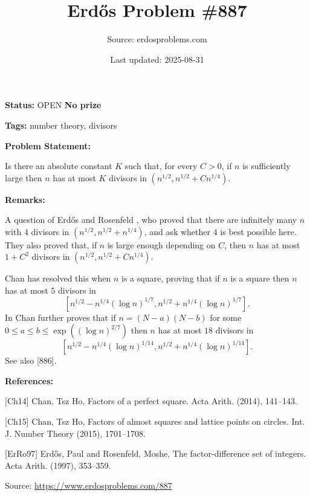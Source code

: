 \documentclass{article}
\title{Erd\H{o}s Problem \#887}
\date{Last updated: 2025-08-31}
\author{Source: erdosproblems.com}
\begin{document}
\maketitle

\noindent\textbf{Status:} OPEN \quad \textbf{No prize}

\noindent\textbf{Tags:} number theory, divisors

\medskip
\noindent\textbf{Problem Statement:}

Is there an absolute constant $K$ such that, for every $C>0$, if $n$ is sufficiently large then $n$ has at most $K$ divisors in $(n^{1/2},n^{1/2}+C n^{1/4})$.

\bigskip
\noindent\textbf{Remarks:}

A question of Erd\H{o}s and Rosenfeld \cite{ErRo97}, who proved that there are infinitely many $n$ with $4$ divisors in $(n^{1/2},n^{1/2}+n^{1/4})$, and ask whether $4$ is best possible here. They also proved that, if $n$ is large enough depending on $C$, then $n$ has at most $1+C^2$ divisors in $(n^{1/2},n^{1/2}+C n^{1/4})$. 

Chan \cite{Ch14} has resolved this when $n$ is a square, proving that if $n$ is a square then $n$ has at most $5$ divisors in\[[ n^{1/2}-n^{1/4}(\log n)^{1/7}, n^{1/2}+n^{1/4}(\log n)^{1/7}].\]In \cite{Ch15} Chan further proves that if $n=(N-a)(N-b)$ for some $0\leq a\leq b\leq \exp((\log n)^{2/7})$ then $n$ has at most $18$ divisors in\[[ n^{1/2}-n^{1/4}(\log n)^{1/14}, n^{1/2}+n^{1/4}(\log n)^{1/14}].\]See also [886].

\bigskip
\noindent\textbf{References:}

[Ch14] Chan, Tsz Ho, Factors of a perfect square. Acta Arith. (2014), 141--143.
 
 [Ch15] Chan, Tsz Ho, Factors of almost squares and lattice points on circles. Int. J. Number Theory (2015), 1701--1708.
 
 [ErRo97] Erd\H{o}s, Paul and Rosenfeld, Moshe, The factor-difference set of integers. Acta Arith. (1997), 353--359.

\bigskip
\noindent\small{Source: \url{https://www.erdosproblems.com/887}}
\end{document}
